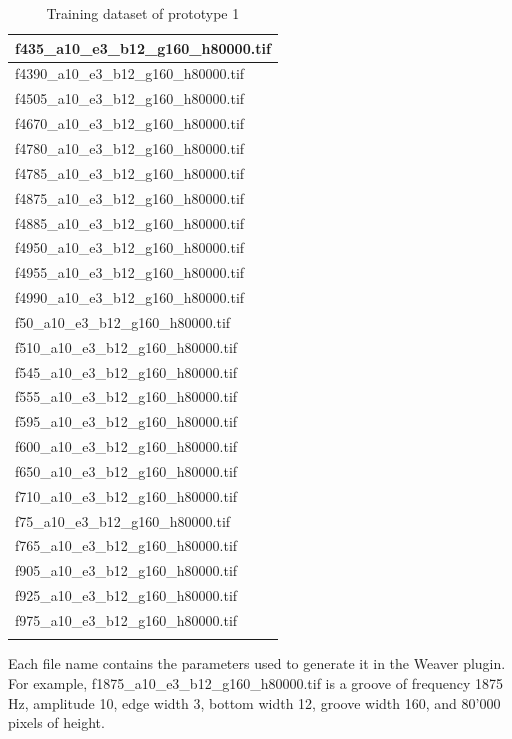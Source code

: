 \documentclass[12pt, twoside]{article}
\begin{document}
\begin{appendices}
\begin{longtable}{|l|}
			f435\_a10\_e3\_b12\_g160\_h80000.tif \\ \hline 
			f4390\_a10\_e3\_b12\_g160\_h80000.tif \\ \hline 
			f4505\_a10\_e3\_b12\_g160\_h80000.tif \\ \hline 
			f4670\_a10\_e3\_b12\_g160\_h80000.tif \\ \hline 
			f4780\_a10\_e3\_b12\_g160\_h80000.tif \\ \hline 
			f4785\_a10\_e3\_b12\_g160\_h80000.tif \\ \hline 
			f4875\_a10\_e3\_b12\_g160\_h80000.tif \\ \hline 
			f4885\_a10\_e3\_b12\_g160\_h80000.tif \\ \hline 
			f4950\_a10\_e3\_b12\_g160\_h80000.tif \\ \hline 
			f4955\_a10\_e3\_b12\_g160\_h80000.tif \\ \hline 
			f4990\_a10\_e3\_b12\_g160\_h80000.tif \\ \hline 
			f50\_a10\_e3\_b12\_g160\_h80000.tif \\ \hline 
			f510\_a10\_e3\_b12\_g160\_h80000.tif \\ \hline 
			f545\_a10\_e3\_b12\_g160\_h80000.tif \\ \hline 
			f555\_a10\_e3\_b12\_g160\_h80000.tif \\ \hline 
			f595\_a10\_e3\_b12\_g160\_h80000.tif \\ \hline 
			f600\_a10\_e3\_b12\_g160\_h80000.tif \\ \hline 
			f650\_a10\_e3\_b12\_g160\_h80000.tif \\ \hline 
			f710\_a10\_e3\_b12\_g160\_h80000.tif \\ \hline 
			f75\_a10\_e3\_b12\_g160\_h80000.tif \\ \hline 
			f765\_a10\_e3\_b12\_g160\_h80000.tif \\ \hline 
			f905\_a10\_e3\_b12\_g160\_h80000.tif \\ \hline 
			f925\_a10\_e3\_b12\_g160\_h80000.tif \\ \hline 
			f975\_a10\_e3\_b12\_g160\_h80000.tif \\ \hline 
		\caption{Training dataset of prototype 1}
		\label{proto1_train}
	\end{longtable}
	Each file name contains the parameters used to generate it in the Weaver plugin. For example, f1875\_a10\_e3\_b12\_g160\_h80000.tif is a groove of frequency 1875 Hz, amplitude 10, edge width 3, bottom width 12, groove width 160, and 80'000 pixels of height.
	

\end{appendices}
\end{document}
